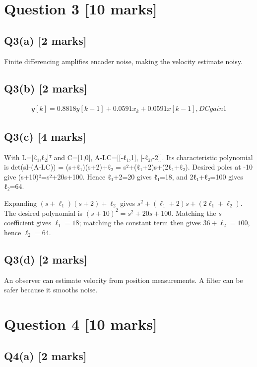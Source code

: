 \documentclass[11pt,a4paper]{article}
\begin{document}
\vspace{2mm}

\section*{Question 3 \hfill [10 marks]}
\subsection*{Q3(a) \hfill [2 marks]}

Finite differencing amplifies encoder noise, making the velocity estimate noisy.

\subsection*{Q3(b) \hfill [2 marks]}

\[\begin{aligned}y[k]=0.8818y[k-1]+0.0591x_k+0.0591x[k-1], DC gain 1\end{aligned}\]

\subsection*{Q3(c) \hfill [4 marks]}

With L=[ℓ₁,ℓ₂]ᵀ and C=[1,0], A-LC=[[-ℓ₁,1], [-ℓ₂,-2]].
Its characteristic polynomial is det(sI-(A-LC)) = (s+ℓ₁)(s+2)+ℓ₂ = s²+(ℓ₁+2)s+(2ℓ₁+ℓ₂).
Desired poles at -10 give (s+10)²=s²+20s+100.
Hence ℓ₁+2=20 gives ℓ₁=18, and 2ℓ₁+ℓ₂=100 gives ℓ₂=64.\par\smallskip Expanding $(s+\ell_1)(s+2)+\ell_2$ gives $s^2+(\ell_1+2)s+(2\ell_1+\ell_2)$. The desired polynomial is $(s+10)^2=s^2+20s+100$. Matching the $s$ coefficient gives $\ell_1=18$; matching the constant term then gives $36+\ell_2=100$, hence $\ell_2=64$.

\subsection*{Q3(d) \hfill [2 marks]}

An observer can estimate velocity from position measurements.
A filter can be safer because it smooths noise.

\section*{Question 4 \hfill [10 marks]}
\subsection*{Q4(a) \hfill [2 marks]}
\end{document}
